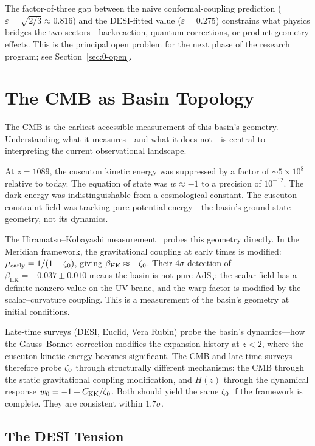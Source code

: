 The factor-of-three gap between the naive conformal-coupling prediction
($\varepsilon = \sqrt{2/3} \approx 0.816$) and the DESI-fitted value
($\varepsilon = 0.275$) constrains what physics bridges the two
sectors---backreaction, quantum corrections, or product geometry
effects. This is the principal open problem for the next phase of the
research program; see Section~\ref{sec:0-open}.

\section{The CMB as Basin Topology}
\label{sec:0-cmb}

The CMB is the earliest accessible measurement of this basin's
geometry. Understanding what it measures---and what it does not---is
central to interpreting the current observational landscape.

At $z = 1089$, the cuscuton kinetic energy was suppressed by a factor
of $\sim 5 \times 10^8$ relative to today. The equation of state was
$w \approx -1$ to a precision of $10^{-12}$. The dark energy was
indistinguishable from a cosmological constant. The cuscuton
constraint field was tracking pure potential energy---the basin's
ground state geometry, not its dynamics.

The Hiramatsu--Kobayashi measurement~\cite{ch2:Hiramatsu2022} probes
this geometry directly. In the Meridian framework, the gravitational
coupling at early times is modified:
$\mu_{\mathrm{early}} = 1/(1 + \zeta_0)$, giving
$\beta_{\mathrm{HK}} \approx -\zeta_0$. Their $4\sigma$ detection of
$\beta_{\mathrm{HK}} = -0.037 \pm 0.010$ means the basin is not pure
$\mathrm{AdS}_5$: the scalar field has a definite nonzero value on the
UV brane, and the warp factor is modified by the scalar--curvature
coupling. This is a measurement of the basin's geometry at initial
conditions.

Late-time surveys (DESI, Euclid, Vera Rubin) probe the basin's
dynamics---how the Gauss--Bonnet correction modifies the expansion
history at $z < 2$, where the cuscuton kinetic energy becomes
significant. The CMB and late-time surveys therefore probe $\zeta_0$
through structurally different mechanisms: the CMB through the static
gravitational coupling modification, and $H(z)$ through the dynamical
response $w_0 = -1 + C_{\mathrm{KK}} / \zeta_0$. Both should yield the same $\zeta_0$ if
the framework is complete. They are consistent within $1.7\sigma$.

\subsection{The DESI Tension}
\label{sec:0-desi-tension}

